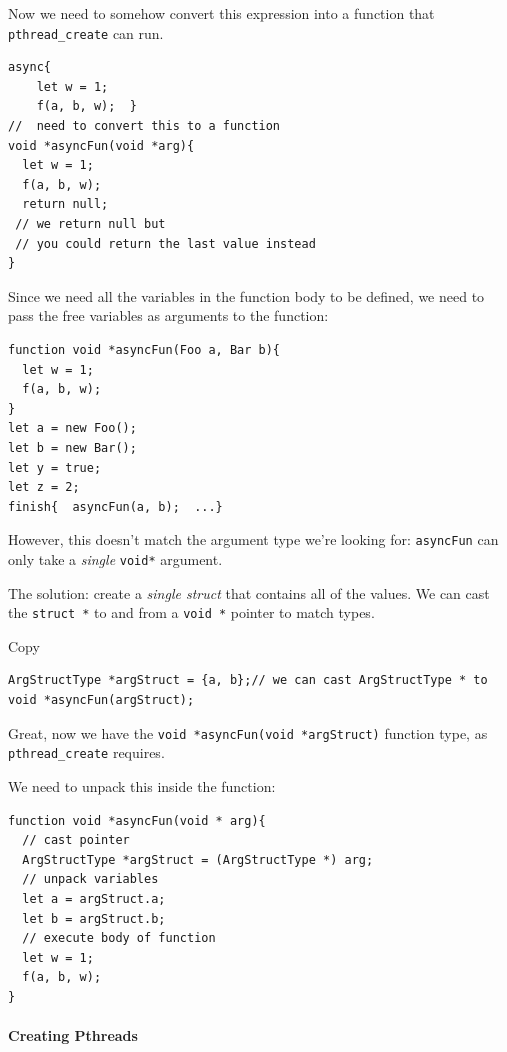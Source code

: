 Now we need to somehow convert this expression into a function that
\texttt{pthread\_create} can run.


\begin{verbatim}
async{
    let w = 1;
    f(a, b, w);  }
//  need to convert this to a function
void *asyncFun(void *arg){
  let w = 1;
  f(a, b, w);
  return null;
 // we return null but 
 // you could return the last value instead
}
\end{verbatim}

Since we need all the variables in the function body to be defined, we
need to pass the free variables as arguments to the function:


\begin{verbatim}
function void *asyncFun(Foo a, Bar b){
  let w = 1;
  f(a, b, w);
}
let a = new Foo();
let b = new Bar();
let y = true;
let z = 2;
finish{  asyncFun(a, b);  ...}
\end{verbatim}

However, this doesn't match the argument type we're looking for:
\texttt{asyncFun} can only take a \emph{single} \texttt{void*} argument.

The solution: create a \emph{single struct} that contains all of the
values. We can cast the \texttt{struct\ *} to and from a
\texttt{void\ *} pointer to match types.

Copy

\begin{verbatim}
ArgStructType *argStruct = {a, b};// we can cast ArgStructType * to void *asyncFun(argStruct);
\end{verbatim}

Great, now we have the \texttt{void\ *asyncFun(void\ *argStruct)}
function type, as \texttt{pthread\_create} requires.

We need to unpack this inside the function:


\begin{verbatim}
function void *asyncFun(void * arg){
  // cast pointer
  ArgStructType *argStruct = (ArgStructType *) arg;
  // unpack variables
  let a = argStruct.a;
  let b = argStruct.b;
  // execute body of function
  let w = 1;
  f(a, b, w);
}
\end{verbatim}

\hypertarget{creating-pthreads}{%
\paragraph{\texorpdfstring{\protect\hyperlink{creating-pthreads}{}Creating
Pthreads}{Creating Pthreads}}\label{creating-pthreads}}

